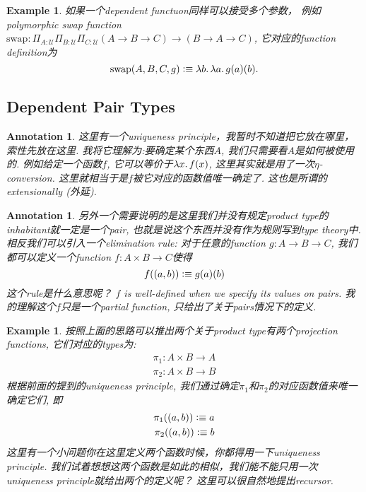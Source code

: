\documentclass{article}
\newtheorem{example}[theorem]{Example}
\newtheorem{annotation}[theorem]{Annotation}
\newcommand{\lam}[2]{\ensuremath{\lambda #1\ldotp #2}} %
\newcommand{\defeqv}{\vcentcolon\equiv}
\begin{document}
\begin{example}
\rm 如果一个dependent functuon同样可以接受多个参数， 例如polymorphic swap function $\text{swap}: \Pi_{A:\mathcal{U}}\Pi_{B:\mathcal{U}}\Pi_{C:\mathcal{U}}(A \to B \to C) \to (B \to A \to C)$, 它对应的function definition为
\[
	\text{swap}(A,B,C,g) \defeqv \lam{b}{\lam{a}{g(a)(b)}}.
\]
\end{example}

\subsection{Dependent Pair Types}

\begin{annotation}
\rm 这里有一个uniqueness principle，我暂时不知道把它放在哪里，索性先放在这里. 我将它理解为:要确定某个东西$A$, 我们只需要看$A$是如何被使用的. 例如给定一个函数$f$, 它可以等价于$\lam{x}{f(x)}$, 这里其实就是用了一次$\eta$-conversion. 这里就相当于是$f$被它对应的函数值唯一确定了. 这也是所谓的extensionally (外延). %
\end{annotation}

\begin{annotation}
\rm 另外一个需要说明的是这里我们并没有规定product type的inhabitant就一定是一个pair, 也就是说这个东西并没有作为规则写到type theory中. 相反我们可以引入一个elimination rule: 对于任意的function $g: A \to B \to C$, 我们都可以定义一个function $f: A \times B \to C$使得
\[
	f((a,b)) \defeqv g(a)(b)
\]
这个rule是什么意思呢？ $f$ is well-defined when we specify its values on pairs. 我的理解这个$f$只是一个partial function, 只给出了关于pairs情况下的定义. %
\end{annotation}

\begin{example}
\rm 按照上面的思路可以推出两个关于product type有两个projection functions, 它们对应的types为:
\[
	\begin{aligned}
	\pi_1: A \times B \to A \\
	\pi_2: A \times B \to B
	\end{aligned}
\]
根据前面的提到的uniqueness principle, 我们通过确定$\pi_1$和$\pi_2$的对应函数值来唯一确定它们, 即
\[
	\begin{aligned}
	\pi_1((a,b)) \defeqv a \\
	\pi_2((a,b)) \defeqv b 
	\end{aligned}
\]
这里有一个小问题你在这里定义两个函数时候，你都得用一下uniqueness principle. 我们试着想想这两个函数是如此的相似，我们能不能只用一次uniqueness principle就给出两个的定义呢？ 这里可以很自然地提出recursor.
\end{example}
\end{document}
